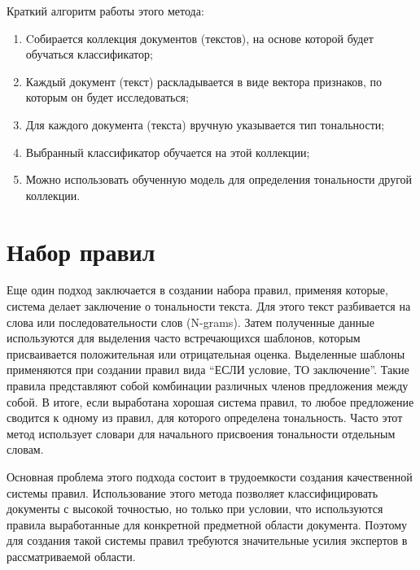 Краткий алгоритм работы этого метода:
\begin{enumerate}
\item Cобирается коллекция документов (текстов), на основе которой будет обучаться
  классификатор; 
\item Каждый документ (текст) раскладывается в виде вектора признаков, по которым
  он будет исследоваться; 
\item Для каждого документа (текста) вручную указывается тип тональности;
\item Выбранный классификатор обучается на этой коллекции;
\item Можно использовать обученную модель для определения тональности другой
  коллекции.
\end{enumerate}

\section{Набор правил}
Еще один подход заключается в создании набора правил, применяя которые, система
делает заключение о тональности текста. Для этого текст разбивается на слова
или последовательности слов (N-grams). Затем полученные данные используются для
выделения часто встречающихся шаблонов, которым присваивается положительная
или отрицательная оценка. Выделенные шаблоны применяются при создании правил
вида ``ЕСЛИ условие, ТО заключение''. Такие правила представляют собой
комбинации различных членов предложения между собой. В итоге, если выработана
хорошая система правил, то любое предложение сводится к одному из правил, для
которого определена тональность. Часто этот метод использует словари для
начального присвоения тональности отдельным словам.

Основная проблема этого подхода состоит в трудоемкости создания качественной
системы правил. Использование этого метода позволяет классифицировать документы
с высокой точностью, но только при условии, что используются правила
выработанные для конкретной предметной области документа. Поэтому для создания
такой системы правил требуются значительные усилия экспертов в рассматриваемой
области.

\FloatBarrier

